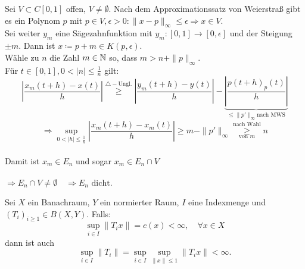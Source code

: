 \begin{beweis}
\begin{enumerate}[label=\roman*\upshape)]
			Sei $V \subset C[0, 1]$ offen, $V \neq \emptyset$. Nach dem Approximationssatz von Weierstra{\ss} gibt es ein Polynom $p$ mit $p \in V, \epsilon > 0: \| x - p \|_{\infty} \leq \epsilon \Rightarrow x \in V$. \\
			Sei weiter $y_{m}$ eine Sägezahnfunktion mit $y_{m}: [0, 1] \rightarrow [0, \epsilon]$ und der Steigung $\pm m$.
			Dann ist $x \coloneqq p + {m} \in K(p, \epsilon)$. \\
			Wähle zu $n$ die Zahl $m \in \mathbb{N}$ so, dass $m > n + \| p \|_{\infty}$. \\
			Für $t \in [0, 1], 0 < | n | \leq \frac{1}{n}$ gilt:
			\[ \left| \frac{x_{m}(t + h) - x(t)}{h} \right| \overset{\triangle-\text{Ungl.}}{\geq} \left| \frac{y_{m}(t + h) - y(t)}{h} \right| - \underbrace{\left| \frac{p(t + h) _ p(t)}{h} \right|}_{\leq{\| p' \|_{\infty}} \text{nach MWS}}  \]
			\[ \Rightarrow \sup_{0 < |h| \leq \frac{1}{n}} \left| \frac{x_{m}(t + h) - x_{m}(t)}{h} \right| \geq m - \| p' \|_{\infty} \overset{\text{nach Wahl}}{\underset{\text{von }m}{\geq}} n \] \\
			Damit ist $x_{m} \in E_{n}$ und sogar $x_{m} \in E_{n} \cap V$ \\ \\
			$\Rightarrow E_{n} \cap V \neq \emptyset \quad \Rightarrow E_{n} \text{ dicht.}$
	\end{enumerate}	
\end{beweis}


\begin{satz} \label{satz:9.5-Banach-Steinhaus} 
	Sei $X$ ein Banachraum, $Y$ ein normierter Raum, $I$ eine Indexmenge und $(T_{i})_{i \geq 1} \in B(X, Y)$.
	Falls:
	\[ \sup_{i \in I} \| T_{i} x \| = c(x) < \infty, \quad \forall x \in X \]
	dann ist auch
	\[ \sup_{i \in I} \| T_{i} \| = \sup_{i \in I} \sup_{\| x \| \leq 1} \| T_{i} x \| < \infty. \]
\end{satz}

